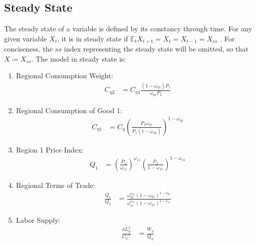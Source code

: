 \documentclass[../thesis.tex]{subfiles}
\begin{document}
\newpage


\subsection{Steady State}

The steady state of a variable is defined by its constancy through time. For any given variable $X_t$, it is in steady state if $\mathbb{E}_t X_{t+1} = X_t = X_{t-1} = X_{ss}$ \cite[p.41]{costa_junior_understanding_2016}. For conciseness, the $ss$ index representing the steady state will be omitted, so that $X \coloneq X_{ss}$. The model in steady state is:

\begin{enumerate}
	
	\item Regional Consumption Weight:
	\begin{align}
		C_{\eta 2} &= C_{\eta 1} \frac{(1 - \omega_{\eta 1}) P_{1}}{\omega_{\eta 1} P_{2}} \label{eq_v6:reg-ss-C-eta-12-t}
	\end{align}
	
	\item Regional Consumption of Good 1:	
	\begin{align}
		C_{\eta 1} &= C_{\eta} \left( \frac{P_{2} \omega_{\eta 1}}{P_{1} (1 - \omega_{\eta 1})} \right)^{1-\omega_{\eta 1}} \label{eq_v6:reg-ss-C-eta-1-t}
	\end{align}
	
	\item Region 1 Price Index:
	\begin{align}
		Q_{1} &= \left( \frac{P_{1}}{\omega_{11}} \right)^{\omega_{11}} \left( \frac{P_{2}}{1 -\omega_{11}} \right)^{1 -\omega_{11}} \label{eq_v6:reg-ss-total-expense-level}
	\end{align}
	
	\item Regional Terms of Trade:
	\begin{align}
		\frac{Q_{1}}{Q_{2}} &= \frac{\omega_{21}^{\omega_{21}} (1 -\omega_{21})^{1 -\omega_{21}}}{\omega_{11}^{\omega_{11}} (1 - \omega_{11})^{1 - \omega_{11}}} \label{eq_v6:reg-ss-total-expense-level-2}
	\end{align}
	
	\item Labor Supply:
	\begin{align}
		\frac{\phi L_{\eta}^{\varphi}}{C_{\eta}^{-\sigma}} &= \frac{W_{\eta}}{Q_{\eta}} \label{eq_v6:reg-ss-labor-supply}
	\end{align}
	

\end{enumerate}
\end{document}
